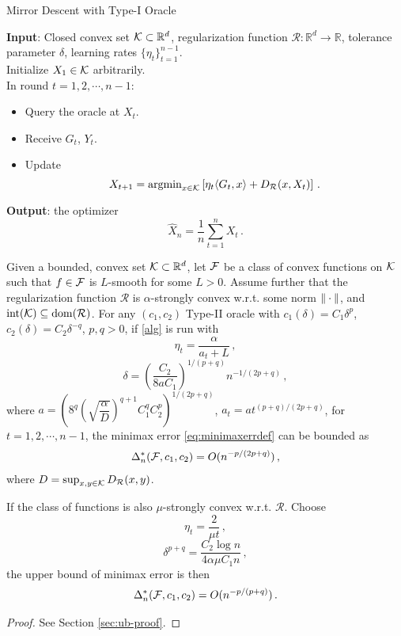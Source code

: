 %

\begin{algorithm}
	\caption{Mirror Descent with Type-I Oracle}\label{alg}
	\textbf{Input}: Closed convex set $\mathcal{K} \subset \mathbb{R}^d$, regularization function $\mathcal{R}:\mathbb{R}^d\to \mathbb{R}$, tolerance parameter $\delta$, learning rates $\{\eta_t\}_{t=1}^{n-1}$. \\
	Initialize $X_1\in \mathcal{K}$ arbitrarily.\\
	In round $t=1, 2, \cdots, n-1$:
	\begin{itemize}
	\item Query the oracle at $X_t$.
	\item Receive $G_t$, $Y_t$.
	\item Update
	\[
	X_{t+1}=\operatorname{argmin}_{x\in \mathcal{K}}\left[ \eta_{t} \langle G_t,x \rangle+D_{\mathcal{R}}(x,X_t) \right] \,.
	\]
	\end{itemize}
	\textbf{Output}: the optimizer
	\[
	\hat{X}_n = \dfrac{1}{n}\sum_{t=1}^n X_t \,.
	\]
	
\end{algorithm}

\begin{theorem}
\label{thm:ub}
Given a bounded, convex set $\mathcal{K} \subset \mathbb{R}^d$,
let $\mathcal{F}$ be a class of convex functions on $\mathcal{K}$ such that $f \in \mathcal{F}$ is $L$-smooth for some $L>0$.
Assume further that the regularization function $\mathcal{R}$ is $\alpha$-strongly convex w.r.t. some norm $\|\cdot\|$, and $\operatorname{int}(\mathcal{K})\subseteq \operatorname{dom}(\mathcal{R})$.
For any $(c_1,c_2)$ Type-II oracle 
 with $c_1(\delta) = C_1 \delta^p$, $c_2(\delta) = C_2 \delta^{-q}$, $p,q>0$, 
 if \cref{alg} is run with 
 \[
 \eta_t = \dfrac{\alpha}{a_t+L} \,,
 \]
  \[
 \delta = \left( \dfrac{C_2}{8aC_1}\right)^{1/(p+q)}n^{-1/(2p+q)} \,,
 \] 
 where
 $a = \left( 8^q \left(\sqrt{\dfrac{\alpha}{D}}\right)^{q+1}C_1^q C_2^p \right)^{1/(2p+q)}$,
 $a_t = a t^{(p+q)/(2p+q)}$, for $t=1, 2, \cdots, n-1$,
  the minimax error \eqref{eq:minimaxerrdef} can be bounded as
 \begin{align*}
\Delta_n^*(\mathcal{F},c_1,c_2)= O(n^{-p/(2p+q)})\,,
 \end{align*}
 where $D=\sup_{x,y\in \mathcal{K}} D_{\mathcal{R}}(x,y)$.
 
If the class of functions is also $\mu$-strongly convex w.r.t. $\mathcal{R}$. Choose
\[
 \eta_t = \dfrac{2}{\mu t} \,,
\]
\[
\delta^{p+q} =  \dfrac{C_2 \log n}{4\alpha \mu C_1 n} \,,
\]
the upper bound of minimax error is then
 \begin{align*}
\Delta_n^*(\mathcal{F},c_1,c_2)= O(n^{-p/(p+q)})\,.
 \end{align*}
\end{theorem}
\begin{proof}
See Section \ref{sec:ub-proof}.
\end{proof}


